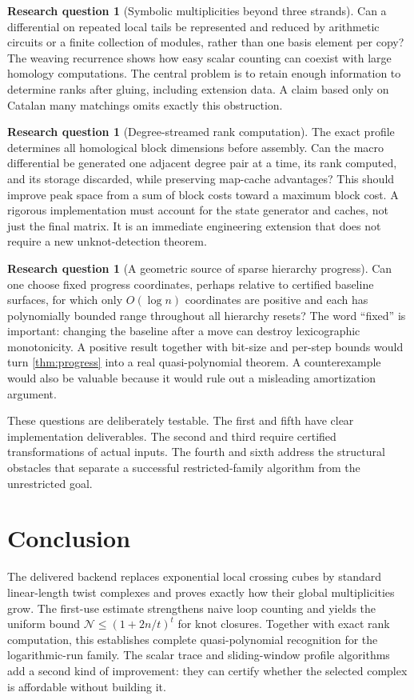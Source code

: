 \documentclass[11pt,letterpaper]{article}
\theoremstyle{definition}
\newtheorem{question}[theorem]{Research question}
\newcommand{\N}{\mathcal N}
\begin{document}
\begin{question}[Symbolic multiplicities beyond three strands]
Can a differential on repeated local tails be represented and reduced by arithmetic circuits or a finite collection of modules, rather than one basis element per copy? The weaving recurrence shows how easy scalar counting can coexist with large homology computations. The central problem is to retain enough information to determine ranks after gluing, including extension data. A claim based only on Catalan many matchings omits exactly this obstruction.
\end{question}

\begin{question}[Degree-streamed rank computation]
The exact profile determines all homological block dimensions before assembly. Can the macro differential be generated one adjacent degree pair at a time, its rank computed, and its storage discarded, while preserving map-cache advantages? This should improve peak space from a sum of block costs toward a maximum block cost. A rigorous implementation must account for the state generator and caches, not just the final matrix. It is an immediate engineering extension that does not require a new unknot-detection theorem.
\end{question}

\begin{question}[A geometric source of sparse hierarchy progress]
Can one choose fixed progress coordinates, perhaps relative to certified baseline surfaces, for which only \(O(\log n)\) coordinates are positive and each has polynomially bounded range throughout all hierarchy resets? The word ``fixed'' is important: changing the baseline after a move can destroy lexicographic monotonicity. A positive result together with bit-size and per-step bounds would turn \cref{thm:progress} into a real quasi-polynomial theorem. A counterexample would also be valuable because it would rule out a misleading amortization argument.
\end{question}

These questions are deliberately testable. The first and fifth have clear implementation deliverables. The second and third require certified transformations of actual inputs. The fourth and sixth address the structural obstacles that separate a successful restricted-family algorithm from the unrestricted goal.

\section{Conclusion}
The delivered backend replaces exponential local crossing cubes by standard linear-length twist complexes and proves exactly how their global multiplicities grow. The first-use estimate strengthens naive loop counting and yields the uniform bound
\(\N\leq(1+2n/t)^t\) for knot closures. Together with exact rank computation, this establishes complete quasi-polynomial recognition for the logarithmic-run family. The scalar trace and sliding-window profile algorithms add a second kind of improvement: they can certify whether the selected complex is affordable without building it.
\end{document}
